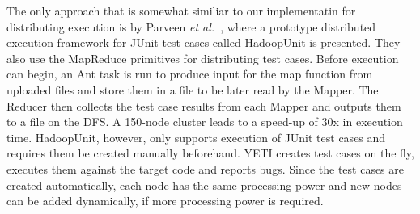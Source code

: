 The only approach that is somewhat similiar to our implementatin for distributing execution is by Parveen \textit{et al.}~\cite{parveen}, where a prototype distributed execution framework for 
JUnit test cases called HadoopUnit is presented. They also use the MapReduce primitives for distributing test cases. Before execution can begin, an Ant task is run 
to produce input for the map function from uploaded files and store them in a file to be later read by the Mapper. The Reducer then collects the test case results from each Mapper 
and outputs them to a file on the DFS. A 150-node cluster leads to a speed-up of 30x in execution time. 
HadoopUnit, however, only supports execution of JUnit test cases and requires them be created manually beforehand. YETI creates test cases on the fly, executes them against the target code and reports bugs.  
Since the test cases are created automatically, each node has the same processing power and new nodes can be added dynamically, if more processing power is required. 



